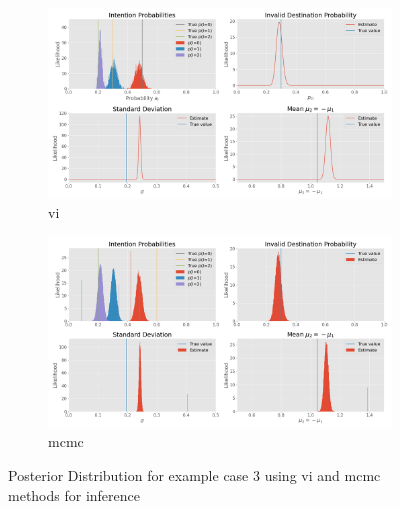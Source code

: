 \begin{figure}[h]
    \centering
    \begin{subfigure}{\textwidth}
    \includegraphics[width=\textwidth]{figures/example_3_vi_posterior.png}
    \caption{\acrshort{vi}}
    \end{subfigure}
    \begin{subfigure}{\textwidth}
    \includegraphics[width=\textwidth]{figures/example_3_mcmc_posterior.png}
    \caption{\acrshort{mcmc}}
    \end{subfigure}
    \caption{Posterior Distribution for example case 3 using \acrshort{vi} and \acrshort{mcmc} methods for inference}
    \label{fig:example_case_3}
\end{figure}